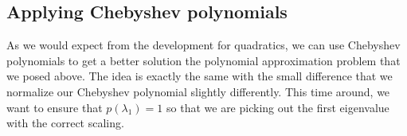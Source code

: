 \subsection{Applying Chebyshev polynomials}

As we would expect from the development for quadratics, we can use Chebyshev
polynomials to get a better solution the polynomial approximation problem that
we posed above. The idea is exactly the same with the small difference that we
normalize our Chebyshev polynomial slightly differently.  This time around, we
want to ensure that $p(\lambda_1) = 1$ so that we are picking out the first
eigenvalue with the correct scaling. 

%              
%               
